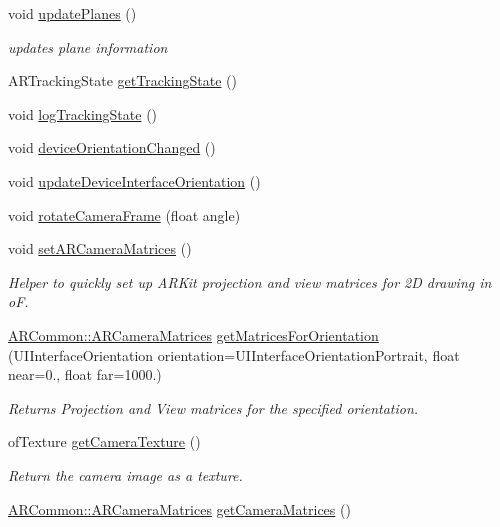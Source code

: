 \begin{DoxyCompactItemize}
void \hyperlink{class_a_r_processor_aaa1488d9082ec598fd4aeb5c5c43d999}{update\+Planes} ()
\begin{DoxyCompactList}\small\item\em updates plane information \end{DoxyCompactList}\item 
A\+R\+Tracking\+State \hyperlink{class_a_r_processor_aa53d195b42b23d9208071692fd5ac28d}{get\+Tracking\+State} ()
\item 
void \hyperlink{class_a_r_processor_a3ae7b56c7d5f555ec84dbd1f1f0a8f65}{log\+Tracking\+State} ()
\item 
void \hyperlink{class_a_r_processor_ac065970f90243b08b9d004a4220d0345}{device\+Orientation\+Changed} ()
\item 
void \hyperlink{class_a_r_processor_a48797c1a249b2f115d0151396bc1eb9c}{update\+Device\+Interface\+Orientation} ()
\item 
void \hyperlink{class_a_r_processor_a2514281144c680e13c02562c74746ceb}{rotate\+Camera\+Frame} (float angle)
\item 
void \hyperlink{class_a_r_processor_a2ffd8b9518388be29eba6affe4d4d152}{set\+A\+R\+Camera\+Matrices} ()
\begin{DoxyCompactList}\small\item\em Helper to quickly set up A\+R\+Kit projection and view matrices for 2D drawing in oF. \end{DoxyCompactList}\item 
\hyperlink{struct_a_r_common_1_1_a_r_camera_matrices}{A\+R\+Common\+::\+A\+R\+Camera\+Matrices} \hyperlink{class_a_r_processor_abcd684d805e880aed72c2eb56a65978f}{get\+Matrices\+For\+Orientation} (U\+I\+Interface\+Orientation orientation=U\+I\+Interface\+Orientation\+Portrait, float near=0., float far=1000.)
\begin{DoxyCompactList}\small\item\em Returns Projection and View matrices for the specified orientation. \end{DoxyCompactList}\item 
of\+Texture \hyperlink{class_a_r_processor_a5eb8045000bc6e0ad3d41d7bbf832047}{get\+Camera\+Texture} ()
\begin{DoxyCompactList}\small\item\em Return the camera image as a texture. \end{DoxyCompactList}\item 
\hyperlink{struct_a_r_common_1_1_a_r_camera_matrices}{A\+R\+Common\+::\+A\+R\+Camera\+Matrices} \hyperlink{class_a_r_processor_a82a9b334360ebccd844e7cf5584eff8b}{get\+Camera\+Matrices} ()

\end{DoxyCompactItemize}

